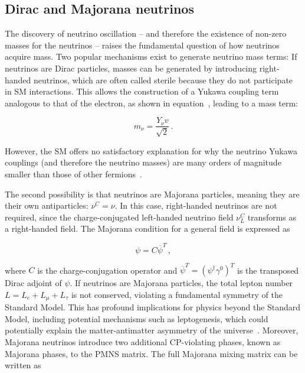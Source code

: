 \subsection{Dirac and Majorana neutrinos}

The discovery of neutrino oscillation -- and therefore the existence of non-zero masses for the neutrinos -- raises the fundamental question of how neutrinos acquire mass. Two popular mechanisms exist to generate neutrino mass terms:
If neutrinos are Dirac particles, masses can be generated by introducing right-handed neutrinos, which are often called sterile because they do not participate in SM interactions. This allows the construction of a Yukawa coupling term analogous to that of the electron, as shown in equation~, leading to a mass term:

\begin{equation}
\label{eq:Yukawa_neutrino}
    m_{\nu} = \frac{Y_{\nu} v}{\sqrt{2}} \,.
\end{equation}

However, the SM offers no satisfactory explanation for why the neutrino Yukawa couplings (and therefore the neutrino masses) are many orders of magnitude smaller than those of other fermions~\cite{giunti_fundamentals_2007}. 

The second possibility is that neutrinos are Majorana particles, meaning they are their own antiparticles: $ \nu^C = \nu$. In this case, right-handed neutrinos are not required, since the charge-conjugated left-handed neutrino field $\nu^C_L$ transforms as a right-handed field. 
The Majorana condition for a general field is expressed as

\begin{equation} 
\label{eq:majorana_condition1}
    \psi = C \overline{\psi}^T \,,
\end{equation}

\noindent where $C$ is the charge-conjugation operator and $\overline{\psi}^T = (\psi^\dagger \gamma^0)^T$ is the transposed Dirac adjoint of $\psi$. 
If neutrinos are Majorana particles, the total lepton number $L = L_e + L_{\mu} + L_{\tau}$ is not conserved, violating a fundamental symmetry of the Standard Model. This has profound implications for physics beyond the Standard Model, including potential mechanisms such as leptogenesis, which could potentially explain the matter-antimatter asymmetry of the universe~\cite{giunti_fundamentals_2007}. 
Moreover, Majorana neutrinos introduce two additional CP-violating phases, known as Majorana phases, to the PMNS matrix. The full Majorana mixing matrix can be written as


